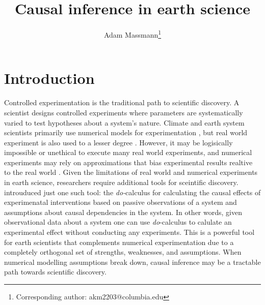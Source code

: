 \documentclass[12pt]{article}
\begin{document}
\title{Causal inference in earth science}

\author{Adam Massmann\thanks{Corresponding author: akm2203@columbia.edu}}

\maketitle

\section{Introduction}

Controlled experimentation is the traditional path to scientific
discovery. A scientist designs controlled experiments where parameters
are systematically varied to test hypotheses about a system's
nature. Climate and earth system scientists primarily use numerical
models for experimentation \citep[e.g.,][]{eyring-cmip6-2016}, but
real world experiment is also used to a lesser degree
\citep[e.g.,][]{ainsworth-face-2005}. However, it may be logisically
impossible or unethical to execute many real world experiments, and
numerical experiments may rely on approximations that bias
experimental results realtive to the real world
\citep[e.g.,][]{kim-cmip5,stillmann-cmip5-extremes}. Given the
limitations of real world and numerical experiments in earth science,
researchers require additional tools for sceintific discovery.
\citet{pearl-1994-do-calculus} introuduced just one such tool: the
\textit{do-}calculus for calculating the causal effects of
experimenatal interventions based on passive observations of a system
and assumptions about causal dependencies in the system. In other
words, given observational data about a system one can use
\textit{do}-calculus to calulate an experimental effect without
conducting any experiments. This is a powerful tool for earth
scientists that complements numerical experimentation due to a
completely orthogonal set of strengths, weaknesses, and
assumptions. When numerical modelling assumptions break down, causal
inference may be a tractable path towards scientific discovery.
\end{document}
